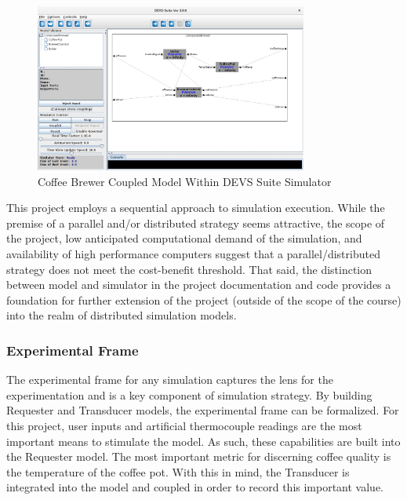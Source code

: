 \documentclass[10pt]{article}
\begin{document}
\begin{center}
  \begin{figure}[H]
    \begin{center}
      \includegraphics[width=0.8\textwidth]{input/model-in-devs}
      \caption{Coffee Brewer Coupled Model Within DEVS Suite Simulator}
      \label{ref:modInDevs}
    \end{center}
  \end{figure}
\end{center}

This project employs a sequential approach to simulation execution.  While the premise of a parallel and/or distributed strategy seems attractive, the scope of the project, low anticipated computational demand of the simulation, and availability of high performance computers suggest that a parallel/distributed strategy does not meet the cost-benefit threshold.  That said, the distinction between model and simulator in the project documentation and code provides a foundation for further extension of the project (outside of the scope of the course) into the realm of distributed simulation models.

\subsubsection{Experimental Frame}
The experimental frame for any simulation captures the lens for the experimentation and is a key component of simulation strategy.  By building Requester and Transducer models, the experimental frame can be formalized.  For this project, user inputs and artificial thermocouple readings are the most important means to stimulate the model.  As such, these capabilities are built into the Requester model.  The most important metric for discerning coffee quality is the temperature of the coffee pot.  With this in mind, the Transducer is integrated into the model and coupled in order to record this important value.
\end{document}
